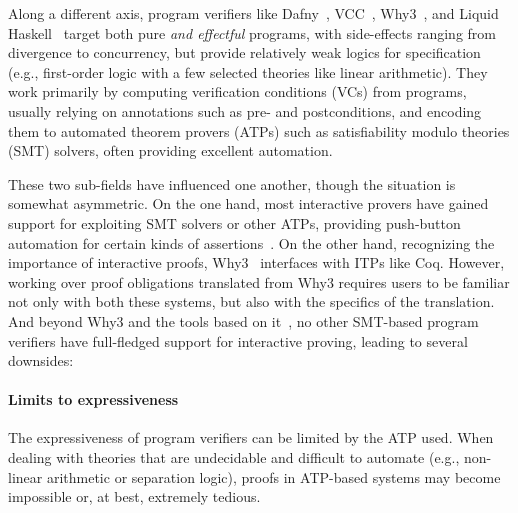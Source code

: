\documentclass[runningheads]{llncs}
\newcommand\fstar{F$^\star$\xspace}
\newcommand{\comm}[3]{\ifcheckpagebudget\else\ifdraft{{\color{#1}[#2: #3]}}\fi\fi}
\newcommand{\ch}[1]{\comm{teal}{CH}{#1}}
\newcommand{\guido}[1]{\comm{blue}{Guido}{#1}}
\begin{document}
Along a different axis, program verifiers like
Dafny~\cite{leino10dafny}, VCC~\cite{CohenMST10},
Why3~\cite{filliatre13why3}, and 
Liquid Haskell~\cite{liquidhaskell} 
target both pure {\em and effectful} programs,
with side-effects ranging from divergence to
concurrency, but provide relatively weak logics for
specification (e.g., first-order
logic with a few selected theories like linear arithmetic).
%
They work primarily by computing verification conditions (VCs)
from programs, usually relying on annotations such as pre- and postconditions,
and encoding them to automated theorem provers (ATPs) such as
satisfiability modulo theories (SMT) solvers,
often providing excellent automation.


These two sub-fields have influenced one another, though
the situation is somewhat asymmetric.
%
On the one hand, most interactive provers have gained support for
exploiting SMT solvers or other ATPs, providing push-button automation
for certain kinds of assertions~\cite{CzajkaK17, smtcoqCAV2017,
PaulsonB10, KaliszykU14, KaliszykU15a}.
%
%
On the other hand, recognizing the importance of interactive proofs,
Why3~\cite{filliatre13why3} interfaces with ITPs like Coq.
%
However, working over proof obligations translated from Why3
requires users to be familiar not only with both these systems, but
also with the specifics of the translation.
%
%
And beyond Why3 and the tools based on it~\cite{CuoqKKPSY12}, no other
SMT-based program verifiers have full-fledged support for interactive
proving, leading to several downsides:

\paragraph{\bf Limits to expressiveness} The expressiveness of program
verifiers can be limited by the ATP used.
When dealing with theories that are undecidable and
difficult to automate (e.g., non-linear arithmetic or
separation logic), proofs in ATP-based systems %
may become impossible or, at best, extremely tedious.
\guido{citations would be nice}
\end{document}
